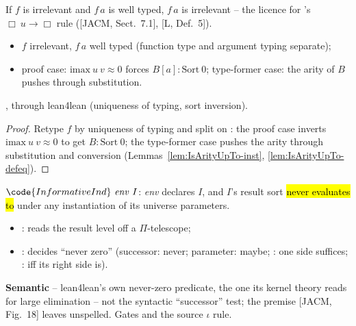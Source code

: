 \begin{theorem}
\label{thm:Erasable-app}
\leanok
{}
 If $f$ is irrelevant and $f\,a$ is well typed, $f\,a$ is irrelevant -- the licence for \lbox{}'s $\Box\ u \to \Box$ rule ([JACM, Sect.\ 7.1], [L, Def.\ 5]).
\begin{itemize}
\item {} $f$ irrelevant, $f\,a$ well typed (function type and argument typing separate);
\item {} proof case: $\mathrm{imax}\ u\ v \approx 0$ forces $B[a] : \mathrm{Sort}\ 0$; type-former case: the arity of $B$ pushes through substitution.
\end{itemize}
 \stProved{}, \stInherited{} through lean4lean (uniqueness of typing, sort inversion).
\end{theorem}
\begin{proof}
\leanok
{}
 Retype $f$ by uniqueness of typing and split on : the proof case
inverts $\mathrm{imax}\ u\ v \approx 0$ to get $B : \mathrm{Sort}\ 0$; the type-former case
pushes the arity through substitution and conversion (Lemmas~\ref{lem:IsArityUpTo-inst},
\ref{lem:IsArityUpTo-defeq}).
\end{proof}

\begin{definition}
\label{def:InformativeInd}
\leanok
{}
 $\code{InformativeInd}\ \mathit{env}\ I$: \emph{env} declares $I$, and $I$'s result sort \hl{never evaluates to } under any instantiation of its universe parameters.
\begin{itemize}
\item {}: reads the result level off a $\Pi$-telescope;
\item {}: decides ``never zero'' (successor: never; parameter: maybe; : one side suffices; : iff its right side is).
\end{itemize}
 \textbf{Semantic} -- lean4lean's own never-zero predicate, the one its kernel theory reads for large elimination -- not the syntactic ``successor'' test; the premise [JACM, Fig.\ 18] leaves unspelled. Gates  and the source $\iota$ rule.
\end{definition}

